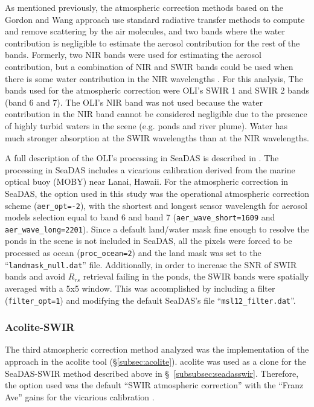 As mentioned previously, the atmospheric correction methods based on the Gordon and Wang approach use standard radiative transfer methods to compute and remove scattering by the air molecules, and two bands where the water contribution is negligible to estimate the aerosol contribution for the rest of the bands. Formerly, two NIR bands were used for estimating the aerosol contribution, but a combination of NIR and SWIR bands could be used when there is some water contribution in the NIR wavelengths \citep{Wang2009}. For this analysis, The bands used for the atmospheric correction were OLI's SWIR 1 and SWIR 2 bands (band 6 and 7). The OLI's NIR band was not used because the water contribution in the NIR band cannot be considered negligible due to the presence of highly turbid waters in the scene (e.g. ponds and river plume). Water has much stronger absorption at the SWIR wavelengths than at the NIR wavelengths. 

A full description of the OLI's processing in SeaDAS is described in \citet{Franz:2015}. The processing in SeaDAS includes a vicarious calibration derived from the marine optical buoy (MOBY) near Lanai, Hawaii. For the atmospheric correction in SeaDAS, the option used in this study was the operational atmospheric correction scheme ({\tt aer\_opt=-2}), with the shortest and longest sensor wavelength for aerosol models selection equal to band 6 and band 7 ({\tt aer\_wave\_short=1609} and {\tt aer\_wave\_long=2201}). Since a default land/water mask fine enough to resolve the ponds in the scene is not included in SeaDAS, all the pixels were forced to be processed as ocean ({\tt proc\_ocean=2}) and the land mask was set to the ``{\tt landmask\_null.dat}'' file. Additionally, in order to increase the SNR of SWIR bands and avoid $R_{rs}$ retrieval failing in the ponds, the SWIR bands were spatially averaged with a 5x5 window. This was accomplished by including a filter ({\tt filter\_opt=1}) and modifying the default SeaDAS's file ``{\tt msl12\_filter.dat}''.
\subsubsection{Acolite-SWIR}
The third atmospheric correction method analyzed was the implementation of the \citet{Gordon:1994} approach in the \gls{acolite} tool (\S\ref{subsec:acolite}). \gls{acolite} was used as a clone for the SeaDAS-SWIR method described above in \S~\ref{subsubsec:seadasswir}. Therefore, the option used was the default ``SWIR atmospheric correction'' with the ``Franz Ave'' gains for the vicarious calibration \citep{Franz:2015}.
